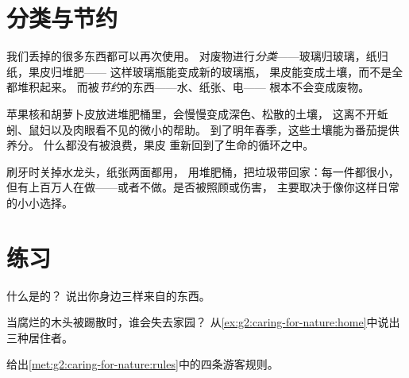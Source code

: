 \section{分类与节约}

\begin{proposition}[废物可以再利用]\label{prop:g2:caring-for-nature:recycle}
我们丢掉的很多东西都可以再次使用。
对废物进行\emph{分类}——玻璃归玻璃，纸归纸，果皮归堆肥——
这样玻璃瓶能变成新的玻璃瓶，
果皮能变成土壤，而不是全都堆积起来。
而被\emph{节约}的东西——水、纸张、电——
根本不会变成废物。
\end{proposition}
\admitted

\begin{example}[堆肥桶]\label{ex:g2:caring-for-nature:compost}
苹果核和胡萝卜皮放进堆肥桶里，会慢慢变成深色、松散的土壤，
这离不开蚯蚓、鼠妇以及肉眼看不见的微小的帮助。
到了明年春季，这些土壤能为番茄提供养分。
什么都没有被浪费，果皮
重新回到了生命的循环之中。
\end{example}

\begin{remark}[小手也能帮忙]\label{rem:g2:caring-for-nature:count}
刷牙时关掉水龙头，纸张两面都用，
用堆肥桶，把垃圾带回家：每一件都很小，
但有上百万人在做——或者不做。是否被照顾或伤害，
主要取决于像你这样日常的小小选择。
\end{remark}

\section{练习}

\begin{exercise}[$\star$]\label{exo:g2:caring-for-nature:1}
什么是的？
说出你身边三样来自的东西。
\end{exercise}

\begin{exercise}[$\star$]\label{exo:g2:caring-for-nature:2}
当腐烂的木头被踢散时，谁会失去家园？
从\cref{ex:g2:caring-for-nature:home}中说出三种居住者。
\end{exercise}

\begin{exercise}[$\star$]\label{exo:g2:caring-for-nature:3}
给出\cref{met:g2:caring-for-nature:rules}中的四条游客规则。
\end{exercise}


